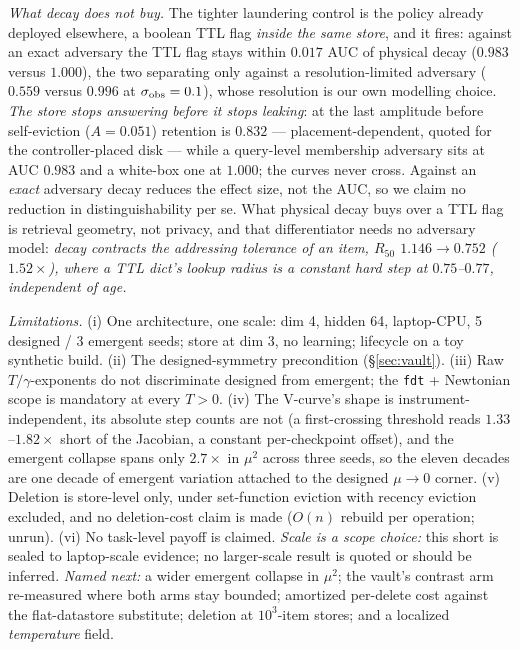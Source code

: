 \documentclass{article}
\makeatletter
\renewcommand\section{\@startsection{section}{1}{\z@}{-1.1ex plus -0.4ex minus -.2ex}{0.7ex plus .2ex}{\normalsize\bf\raggedright}}
\makeatother
\begin{document}
\emph{What decay does not buy.} The tighter laundering control is the policy already deployed elsewhere, a boolean TTL flag \emph{inside the same store}, and it fires: against an exact adversary the TTL flag stays within $0.017$ AUC of physical decay ($0.983$ versus $1.000$), the two separating only against a resolution-limited adversary ($0.559$ versus $0.996$ at $\sigma_{\rm obs}=0.1$), whose resolution is our own modelling choice. \emph{The store stops answering before it stops leaking}: at the last amplitude before self-eviction ($A=0.051$) retention is $0.832$ --- placement-dependent, quoted for the controller-placed disk --- while a query-level membership adversary sits at AUC $0.983$ and a white-box one at $1.000$; the curves never cross. Against an \emph{exact} adversary decay reduces the effect size, not the AUC, so we claim no reduction in distinguishability per se. What physical decay buys over a TTL flag is retrieval geometry, not privacy, and that differentiator needs no adversary model: \emph{decay contracts the addressing tolerance of an item, $R_{50}$ $1.146\to0.752$ ($1.52\times$), where a TTL dict's lookup radius is a constant hard step at $0.75$--$0.77$, independent of age.}

\section{Limitations and future work}\label{sec:limits}

{\scriptsize\emph{Limitations.} (i) One architecture, one scale: dim 4, hidden 64, laptop-CPU, 5 designed / 3 emergent seeds; store at dim 3, no learning; lifecycle on a toy synthetic build. (ii) The designed-symmetry precondition (\S\ref{sec:vault}). (iii) Raw $T/\gamma$-exponents do not discriminate designed from emergent; the \texttt{fdt} + Newtonian scope is mandatory at every $T>0$. (iv) The V-curve's shape is instrument-independent, its absolute step counts are not (a first-crossing threshold reads $1.33$--$1.82\times$ short of the Jacobian, a constant per-checkpoint offset), and the emergent collapse spans only $2.7\times$ in $\mu^2$ across three seeds, so the eleven decades are one decade of emergent variation attached to the designed $\mu\to0$ corner. (v) Deletion is store-level only, under set-function eviction with recency eviction excluded, and no deletion-cost claim is made ($O(n)$ rebuild per operation; unrun). (vi) No task-level payoff is claimed. \emph{Scale is a scope choice:} this short is sealed to laptop-scale evidence; no larger-scale result is quoted or should be inferred. \emph{Named next:} a wider emergent collapse in $\mu^2$; the vault's contrast arm re-measured where both arms stay bounded; amortized per-delete cost against the flat-datastore substitute; deletion at $10^3$-item stores; and a localized \emph{temperature} field.\par}
\clearpage
\appendix
\scriptsize
\end{document}
